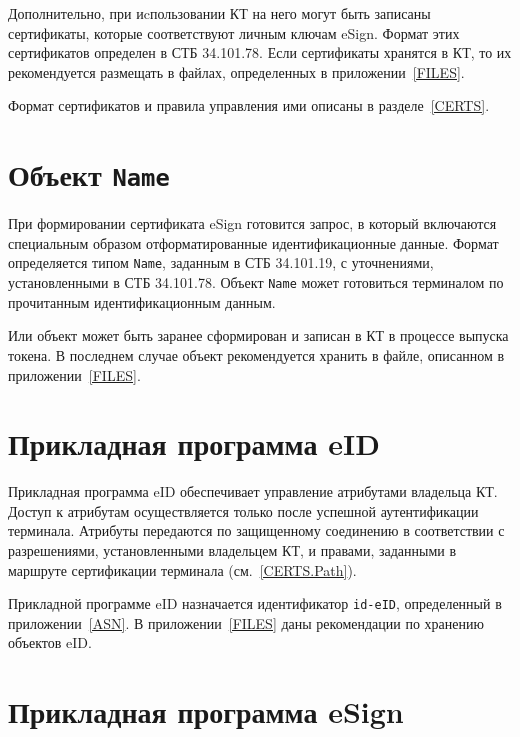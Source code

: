 Дополнительно, при иcпользовании КТ на него могут быть записаны
сертификаты, которые соответствуют личным ключам eSign.
Формат этих сертификатов определен в СТБ 34.101.78.
Если сертификаты хранятся в КТ, то их рекомендуется размещать в файлах, 
определенных в приложении~\ref{FILES}.


Формат сертификатов и правила управления ими описаны в разделе~\ref{CERTS}.

\section{Объект \texttt{Name}}\label{OBJ.Name}

При формировании сертификата eSign готовится запрос, в который включаются 
специальным образом отформатированные идентификационные данные. Формат 
определяется типом \texttt{Name}, заданным в СТБ 34.101.19, 
с уточнениями, установленными в СТБ 34.101.78. Объект \texttt{Name}
может готовиться терминалом по прочитанным идентификационным данным.

Или объект может быть заранее сформирован и записан в КТ в процессе выпуска 
токена. В последнем случае объект рекомендуется хранить в файле,
описанном в приложении~\ref{FILES}.

\section{Прикладная программа eID}\label{OBJ.eID}

Прикладная программа eID обеспечивает управление атрибутами владельца КТ. 
Доступ к атрибутам осуществляется только после успешной аутентификации 
терминала. Атрибуты передаются по защищенному соединению в соответствии с 
разрешениями, установленными владельцем КТ, и правами, заданными в маршруте 
сертификации терминала (см.~\ref{CERTS.Path}).  

Прикладной программе eID назначается идентификатор \verb|id-eID|, 
определенный в приложении~\ref{ASN}. В приложении~\ref{FILES}
даны рекомендации по хранению объектов eID.

\section{Прикладная программа eSign}\label{OBJ.eSign}

